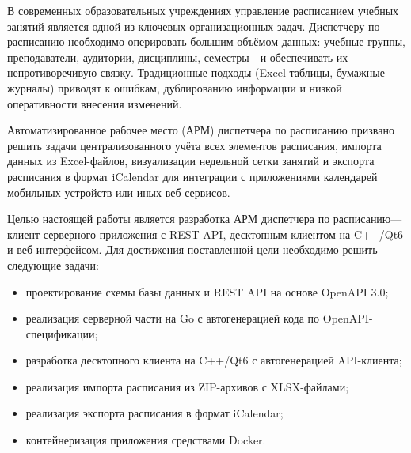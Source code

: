 \Introduction

В современных образовательных учреждениях управление расписанием учебных занятий является одной из ключевых организационных задач. Диспетчеру по расписанию необходимо оперировать большим объёмом данных: учебные группы, преподаватели, аудитории, дисциплины, семестры---и обеспечивать их непротиворечивую связку. Традиционные подходы (Excel-таблицы, бумажные журналы) приводят к ошибкам, дублированию информации и низкой оперативности внесения изменений.

Автоматизированное рабочее место (АРМ) диспетчера по расписанию призвано решить задачи централизованного учёта всех элементов расписания, импорта данных из Excel-файлов, визуализации недельной сетки занятий и экспорта расписания в формат iCalendar для интеграции с приложениями календарей мобильных устройств или иных веб-сервисов.

Целью настоящей работы является разработка АРМ диспетчера по расписанию---клиент-серверного приложения с REST API, десктопным клиентом на C++/Qt6 и веб-интерфейсом. Для достижения поставленной цели необходимо решить следующие задачи:

\begin{itemize}
\item проектирование схемы базы данных и REST API на основе OpenAPI 3.0;
\item реализация серверной части на Go с автогенерацией кода по OpenAPI-спецификации;
\item разработка десктопного клиента на C++/Qt6 с автогенерацией API-клиента;
\item реализация импорта расписания из ZIP-архивов с XLSX-файлами;
\item реализация экспорта расписания в формат iCalendar;
\item контейнеризация приложения средствами Docker.
\end{itemize}

